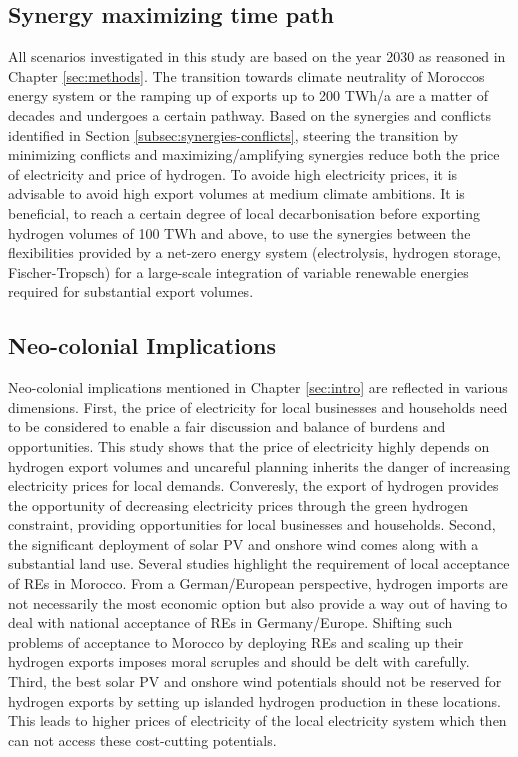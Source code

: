 \subsection{Synergy maximizing time path}
\label{subsec:timepath}
All scenarios investigated in this study are based on the year 2030 as reasoned in Chapter \ref{sec:methods}. The transition towards climate neutrality of Moroccos energy system or the ramping up of exports up to 200 TWh/a are a matter of decades and undergoes a certain pathway. Based on the synergies and conflicts identified in Section \ref{subsec:synergies-conflicts}, steering the transition by minimizing conflicts and maximizing/amplifying synergies reduce both the price of electricity and price of hydrogen. To avoide high electricity prices, it is advisable to avoid high export volumes at medium climate ambitions. It is beneficial, to reach a certain degree of local decarbonisation before exporting hydrogen volumes of 100 TWh and above, to use the synergies between the flexibilities provided by a net-zero energy system (electrolysis, hydrogen storage, Fischer-Tropsch) for a large-scale integration of variable renewable energies required for substantial export volumes.


\subsection{Neo-colonial Implications}
\label{subsec:neocolonial}
Neo-colonial implications mentioned in Chapter \ref{sec:intro} are reflected in various dimensions. First, the price of electricity for local businesses and households need to be considered to enable a fair discussion and balance of burdens and opportunities. This study shows that the price of electricity highly depends on hydrogen export volumes and uncareful planning inherits the danger of increasing electricity prices for local demands. Converesly, the export of hydrogen provides the opportunity of decreasing electricity prices through the green hydrogen constraint, providing opportunities for local businesses and households.
Second, the significant deployment of solar PV and onshore wind comes along with a substantial land use. Several studies \cite{Terrapon-Pfaff2019, Hanger2016} highlight the requirement of local acceptance of REs in Morocco. From a German/European perspective, hydrogen imports are not necessarily the most economic option but also provide a way out of having to deal with national acceptance of REs in Germany/Europe. Shifting such problems of acceptance to Morocco by deploying REs and scaling up their hydrogen exports imposes moral scruples and should be delt with carefully. %
Third, the best solar PV and onshore wind potentials should not be reserved for hydrogen exports by setting up islanded hydrogen production in these locations. This leads to higher prices of electricity of the local electricity system which then can not access these cost-cutting potentials.

